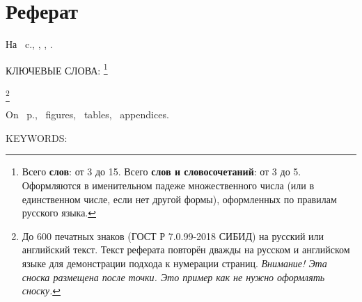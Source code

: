 \chapter*[Count-me]{Реферат} %
\thispagestyle{empty}%
%
%



На ~c.,  
,
,
.  


{\noindent\MakeUppercase{Ключевые слова: \keywordsRu}}\footnote{Всего \textbf{слов}: от 3 до 15. Всего \textbf{слов и словосочетаний}: от 3 до 5. Оформляются в именительном падеже множественного числа (или в единственном числе, если нет другой формы), оформленных по правилам русского языка.} %

\abstractRu\footnote{До 600 печатных знаков (ГОСТ Р 7.0.99-2018 СИБИД) на русский или английский текст. Текст реферата повторён дважды на русском и английском языке для демонстрации подхода к нумерации страниц. \textit{Внимание! Эта сноска размещена после точки. Это пример как не нужно оформлять сноску.}} %

\abstractRu %



\printTheAbstract %


On ~p., 
~figures, 
~tables,
~appendices.


{\noindent\MakeUppercase{Keywords: \keywordsEn}} %
	
\abstractEn %

\abstractEn %
	


\thispagestyle{empty}
%
